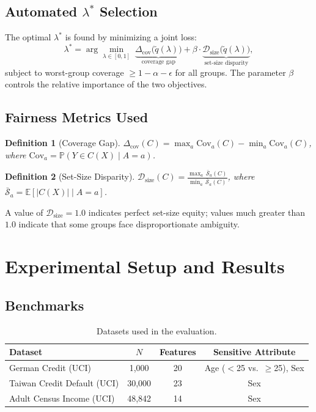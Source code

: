 \documentclass[11pt,a4paper]{article}
\newtheorem{definition}{Definition}
\begin{document}
\subsection{Automated $\lambda^*$ Selection}

The optimal $\lambda^*$ is found by minimizing a joint loss:
\begin{equation}
\lambda^* = \arg\min_{\lambda \in [0,1]}\; \underbrace{\Delta_{\text{cov}}\!\bigl(\tilde{q}(\lambda)\bigr)}_{\text{coverage gap}} + \beta \cdot \underbrace{\mathcal{D}_{\text{size}}\!\bigl(\tilde{q}(\lambda)\bigr)}_{\text{set-size disparity}},
\end{equation}
subject to worst-group coverage $\ge 1 - \alpha - \epsilon$ for all groups. The parameter $\beta$ controls the relative importance of the two objectives.

\subsection{Fairness Metrics Used}

\begin{definition}[Coverage Gap]
$\Delta_{\text{cov}}(C) = \max_{a} \text{Cov}_a(C) - \min_{a} \text{Cov}_a(C)$, where $\text{Cov}_a = \mathbb{P}(Y \in C(X) \mid A = a)$.
\end{definition}

\begin{definition}[Set-Size Disparity]
$\mathcal{D}_{\text{size}}(C) = \frac{\max_a\, \bar{\mathcal{S}}_a(C)}{\min_a\, \bar{\mathcal{S}}_a(C)}$, where $\bar{\mathcal{S}}_a = \mathbb{E}[|C(X)| \mid A = a]$.
\end{definition}

A value of $\mathcal{D}_{\text{size}} = 1.0$ indicates perfect set-size equity; values much greater than $1.0$ indicate that some groups face disproportionate ambiguity.

\section{Experimental Setup and Results}
\label{sec:experiments}

\subsection{Benchmarks}

\begin{table}[htbp]
\centering
\small
\caption{Datasets used in the evaluation.}
\begin{tabular}{@{}lccc@{}}
\toprule
\textbf{Dataset} & \textbf{$N$} & \textbf{Features} & \textbf{Sensitive Attribute} \\
\midrule
German Credit (UCI) & 1,000 & 20 & Age ($<$25 vs.\ $\ge$25), Sex \\
Taiwan Credit Default (UCI) & 30,000 & 23 & Sex \\
Adult Census Income (UCI) & 48,842 & 14 & Sex \\
\bottomrule
\end{tabular}
\end{table}
\end{document}
